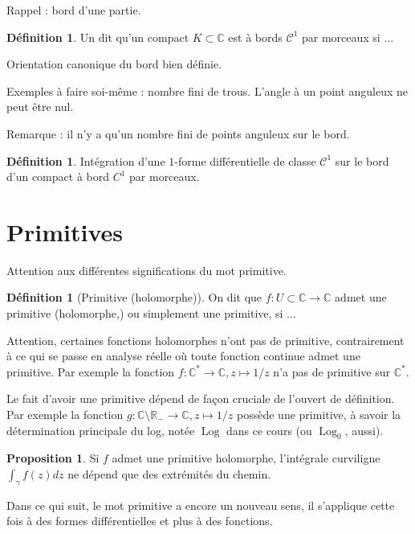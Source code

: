 \documentclass[11pt,a4paper]{book}
\newcommand{\R}{\mathbb{R}}
\newcommand{\C}{\mathbb{C}}
\theoremstyle{definition}
\newtheorem{proposition}[theoreme]{Proposition}
\newtheorem{definition}[theoreme]{D\'efinition}
\theoremstyle{plain}
\begin{document}
Rappel : bord d'une partie.

\begin{definition}
Un dit qu'un compact $K \subset \C$ est à bords $\mathcal C^1$ par morceaux si ...
\end{definition}

Orientation canonique du bord bien définie.

Exemples à faire soi-même : nombre fini de trous. L'angle à un point anguleux ne peut être nul.  

Remarque : il n'y a qu'un nombre fini de points anguleux sur le bord.

\begin{definition}
Intégration d'une $1$-forme différentielle de classe $\mathcal C^1$ sur le bord d'un compact à bord $C^1$ par morceaux.
\end{definition}

\section{Primitives}

Attention aux différentes significations du mot \og primitive\fg. 

\begin{definition}[Primitive (holomorphe)]
On dit que $f : U\subset \C\to \C$ admet une primitive (holomorphe,) ou simplement une primitive, si ...
\end{definition}



Attention, certaines fonctions holomorphes n'ont pas de primitive, contrairement à ce qui se passe en analyse réelle où toute fonction continue admet une primitive. 
Par exemple la fonction $f:\C^*\to \C, z\mapsto 1/z$ n'a pas de primitive sur $\C^*$. 

Le fait d'avoir une primitive dépend de façon cruciale de l'ouvert de définition. Par exemple la fonction $g : \C\setminus \R_- \to \C, z\mapsto 1/z$ possède une primitive, à savoir la détermination principale du log, notée $\operatorname{Log}$ dans ce cours (ou $\operatorname{Log}_0$, aussi).

\begin{proposition}
Si $f$ admet une primitive holomorphe, l'intégrale curviligne $\int_\gamma f(z)dz$ ne dépend que des extrémités du chemin.
\end{proposition}

Dans ce qui suit, le mot \og primitive\fg{} a encore un nouveau sens, il s'applique cette fois à des formes différentielles et plus à des fonctions.
\end{document}

